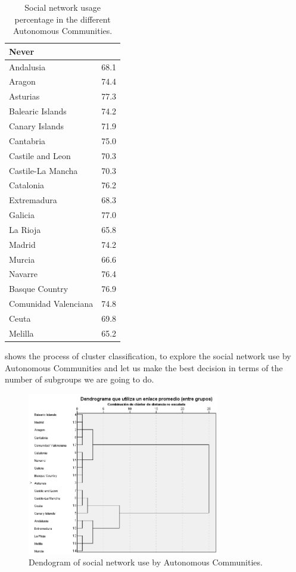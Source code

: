 \documentclass{textolivre}
\begin{document}
\begin{table}[htpb]
\caption{Social network usage percentage in the different Autonomous Communities.}
\label{tbl-tabela-03}
\centering
\begin{tabular}{ll}
\toprule 
Never & \\ 
\midrule
Andalusia & 68.1 \\ 
Aragon & 74.4 \\
Asturias & 77.3 \\
Balearic Islands & 74.2 \\
Canary Islands & 71.9 \\
Cantabria & 75.0 \\
Castile and Leon & 70.3 \\
Castile-La Mancha & 70.3 \\
Catalonia & 76.2 \\
Extremadura & 68.3 \\
Galicia & 77.0 \\
La Rioja & 65.8 \\
Madrid & 74.2 \\
Murcia & 66.6 \\
Navarre & 76.4 \\
Basque Country & 76.9 \\
Comunidad Valenciana & 74.8 \\
Ceuta & 69.8 \\
Melilla & 65.2 \\
\bottomrule
\end{tabular}
\end{table}

 shows the process of cluster classification, to explore the social network use by Autonomous Communities and let us make the best decision in terms of the number of subgroups we are going to do.  

\begin{figure}[htbp]
 \centering
 \includegraphics[width=0.75\textwidth]{fig02}
 \caption{Dendogram of social network use by Autonomous Communities.}
 \label{fig02}
\end{figure}
\end{document}
